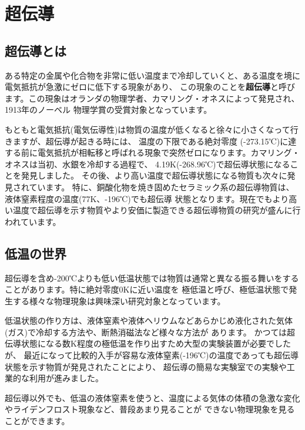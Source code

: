%
%


\section{超伝導}

\subsection{超伝導とは }

ある特定の金属や化合物を非常に低い温度まで冷却していくと、ある温度を境に電気抵抗が急激にゼロに低下する現象があり、
この現象のことを{\bf 超伝導}と呼びます。この現象はオランダの物理学者、カマリング・オネスによって発見され、1913年のノーベル
物理学賞の受賞対象となっています。

もともと電気抵抗(電気伝導性)は物質の温度が低くなると徐々に小さくなって行きますが、超伝導が起きる時には、
温度の下限である絶対零度
(-273.15℃)に達する前に電気抵抗が相転移と呼ばれる現象で突然ゼロになります。カマリング・オネスは当初、水銀を冷却する過程で、
4.19K(-268.96℃)で超伝導状態になることを発見しました。
その後、より高い温度で超伝導状態になる物質も次々に発見されています。
特に、銅酸化物を焼き固めたセラミック系の超伝導物質は、液体窒素程度の温度(77K、-196℃)でも超伝導
状態となります。現在でもより高い温度で超伝導を示す物質やより安価に製造できる超伝導物質の研究が盛んに行われています。

\subsection{低温の世界}

超伝導を含め-200℃よりも低い低温状態では物質は通常と異なる振る舞いをすることがあります。特に絶対零度0Kに近い温度を
極低温と呼び、極低温状態で発生する様々な物理現象は興味深い研究対象となっています。

低温状態の作り方は、液体窒素や液体ヘリウムなどあらかじめ液化された気体(ガス)で冷却する方法や、断熱消磁法など様々な方法が
あります。
かつては超伝導状態になる数K程度の極低温を作り出すため大型の実験装置が必要でしたが、
最近になって比較的入手が容易な液体窒素(-196℃)の温度であっても超伝導状態を示す物質が発見されたことにより、
超伝導の簡易な実験室での実験や工業的な利用が進みました。

超伝導以外でも、低温の液体窒素を使うと、温度による気体の体積の急激な変化やライデンフロスト現象など、普段あまり見ることが
できない物理現象を見ることができます。

